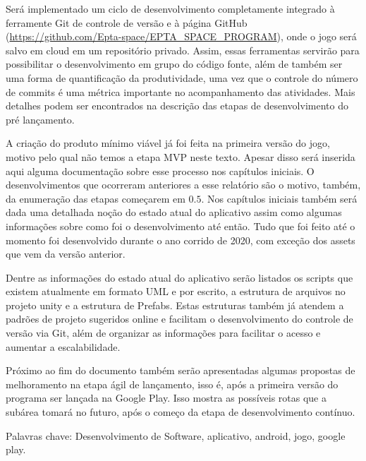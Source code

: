 {    Será implementado um ciclo de desenvolvimento completamente integrado à ferramente Git de controle de versão e à página GitHub (\url{https://github.com/Epta-space/EPTA_SPACE_PROGRAM}), onde o jogo será salvo em cloud em um repositório privado.
    Assim, essas ferramentas servirão para possibilitar o desenvolvimento em grupo do código fonte, além de também ser uma forma de quantificação da produtividade, uma vez que o controle do número de commits é uma métrica importante no acompanhamento das atividades.
    Mais detalhes podem ser encontrados na descrição das etapas de desenvolvimento do pré lançamento.

    A criação do produto mínimo viável já foi feita na primeira versão do jogo, motivo pelo qual não temos a etapa MVP neste texto. 
    Apesar disso será inserida aqui alguma documentação sobre esse processo nos capítulos iniciais.
    O desenvolvimentos que ocorreram anteriores a esse relatório são o motivo, também, da enumeração das etapas começarem em $0.5$.
    Nos capítulos iniciais também será dada uma detalhada noção do estado atual do aplicativo assim como algumas informações sobre como foi o desenvolvimento até então.
    Tudo que foi feito até o momento foi desenvolvido durante o ano corrido de 2020, com exceção dos assets que vem da versão anterior.

    Dentre as informações do estado atual do aplicativo serão listados os scripts que existem atualmente em formato UML e por escrito, a estrutura de arquivos no projeto unity e a estrutura de Prefabs.
    Estas estruturas também já atendem a padrões de projeto sugeridos online e facilitam o desenvolvimento do controle de versão via Git, além de organizar as informações para facilitar o acesso e aumentar a escalabilidade.

    Próximo ao fim do documento também serão apresentadas algumas propostas de melhoramento na etapa ágil de lançamento, isso é, após a primeira versão do programa ser lançada na Google Play. Isso mostra as possíveis rotas que a subárea tomará no futuro, após o começo da etapa de desenvolvimento contínuo.

	\vspace{1cm}
	{\large Palavras chave:} {\small Desenvolvimento de Software, aplicativo, android, jogo, google play.}

}

